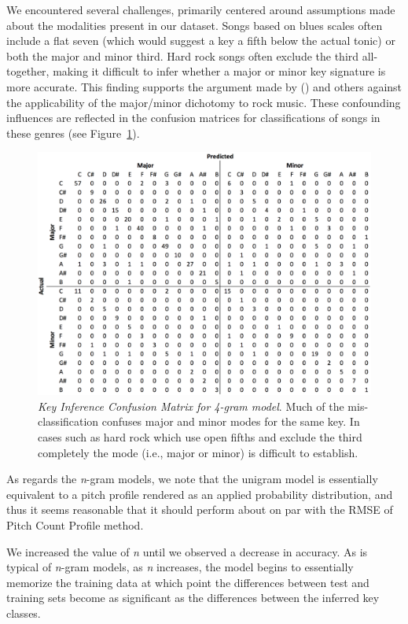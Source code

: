 \documentclass[letterpaper]{article}
\begin{document}
We encountered several challenges, primarily centered around assumptions made about the modalities present in our dataset. Songs based on blues scales often include a flat seven (which would suggest a key a fifth below the actual tonic) or both the major and minor third. Hard rock songs often exclude the third all-together, making it difficult to infer whether a major or minor key signature is more accurate. This finding supports the argument made by \citeauthor{temperley2013statistical} (\citeyear{temperley2013statistical}) and others against the applicability of the major/minor dichotomy to rock music. These confounding influences are reflected in the confusion matrices for classifications of songs in these genres (see Figure~\ref{fig:confusion_matrix}).

\begin{figure}[h]
  \centering
 \includegraphics[width=\linewidth]{./confusion_matrix.png}
  \caption{\label{fig:confusion_matrix}\emph{Key Inference Confusion Matrix for 4-gram model}. Much of the mis-classification confuses major and minor modes for the same key. In cases such as hard rock which use open fifths and exclude the third completely the mode (i.e., major or minor) is difficult to establish.}
\end{figure}

As regards the \emph{n}-gram models, we note that the unigram model is essentially equivalent to a pitch profile rendered as an applied probability distribution, and thus it seems reasonable that it should perform about on par with the RMSE of Pitch Count Profile method.

We increased the value of \emph{n} until we observed a decrease in accuracy. As is typical of \emph{n}-gram models, as \emph{n} increases, the model begins to essentially memorize the training data at which point the differences between test and training sets become as significant as the differences between the inferred key classes.
\end{document}
